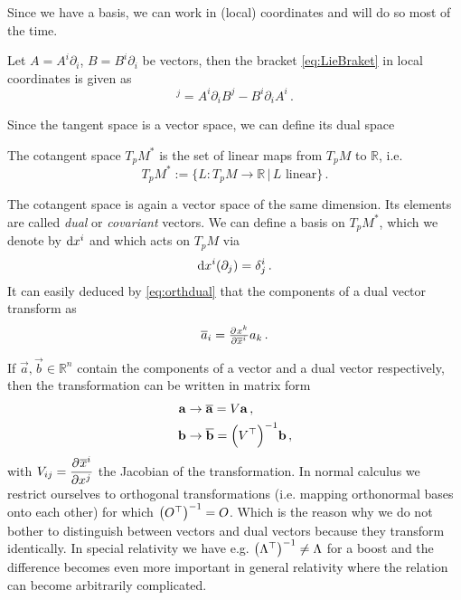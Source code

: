 Since we have a basis, we can work in (local) coordinates and will do so most of
the time.
\begin{example}
Let $A=A^i\partial_i$, $B=B^i\partial_i$ be vectors, then the  bracket
\eqref{eq:LieBraket} in local coordinates is given as
\begin{equation}
    [A,B]^j=A^i\partial_iB^j-B^i\partial_iA^i\, .
\end{equation}
\end{example}
Since the tangent space is a vector space, we can define its dual space
\begin{definition} The cotangent space $T_pM^*$ is the set of
linear maps from $T_pM$ to $\mathbb{R}$, i.e.
\begin{equation}
    T_pM^*:=\{L:T_pM\to \mathbb{R}\, |\, L \text{ linear}\}\, .
\end{equation}
\end{definition}
The cotangent space is again a vector space of the same dimension. Its elements
are called \emph{dual} or \emph{covariant} vectors.
We can define a basis on $	T_pM^*$, which we denote by $\dif x^i$ and  which acts on $T_pM$ via
\begin{equation}
    \dif x^i(\partial_j)=\delta^i_j\, . \label{eq:orthdual}
\end{equation}
It can easily deduced by \eqref{eq:orthdual} that the components of a dual vector transform as
\begin{equation}
    \overline{a}_i=\pd{x^k}{{\overline{x}^i}}a_k\, .
\end{equation}
\begin{remark}
If $\vec{a},\vec{b}\in\mathbb{R}^n$ contain the components of a vector and a
dual vector respectively, then the transformation can be written in matrix form
\begin{align}
    \vec{a}&\to\overline{\vec{a}}= V\vec{a}\, ,\\
    \vec{b}&\to\overline{\vec{b}}=\left(V\transpose\right)^{-1}\vec{b}\, ,
\end{align}
with $V_{ij}=\dpd{\overline{x}^i}{{x^j}}$ the
Jacobian of the transformation.
In normal calculus we restrict ourselves to orthogonal transformations (i.e.
mapping orthonormal bases onto each other) for which
$\left(O\transpose\right)^{-1}=O$.
Which is the reason why we do not bother to distinguish between vectors and dual vectors because they transform identically. 
In special relativity we have e.g.
$\left(\Lambda\transpose\right)^{-1}\neq\Lambda$ for a boost and the difference
becomes even more important in general relativity where the relation can become arbitrarily complicated.
\end{remark}
